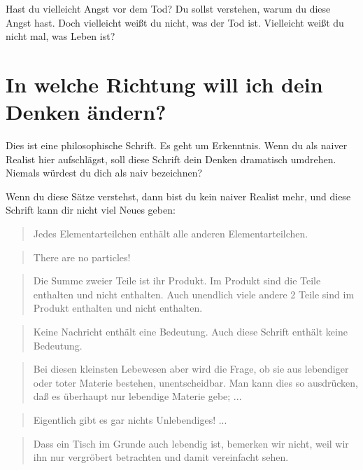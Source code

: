 \documentclass[12pt]{book}
\begin{document}
Hast du vielleicht Angst vor dem Tod? Du sollst verstehen, warum du diese Angst hast.
Doch vielleicht weißt du nicht, was der Tod ist. Vielleicht weißt du nicht mal, was Leben ist?

\section{In welche Richtung will ich dein Denken ändern?}

Dies ist eine philosophische Schrift. Es geht um Erkenntnis. Wenn du als naiver Realist hier aufschlägst, soll diese Schrift
dein Denken dramatisch umdrehen. Niemals würdest du dich als naiv bezeichnen?

Wenn du diese Sätze verstehst, dann bist du kein naiver Realist mehr, und diese Schrift kann dir nicht viel Neues geben:
\begin{quote}\begin{tcolorbox}
Jedes Elementarteilchen enthält alle anderen Elementarteilchen.
\end{tcolorbox}\end{quote}
\begin{quote}\begin{tcolorbox}
There are no particles!
\end{tcolorbox}\end{quote}
\begin{quote}\begin{tcolorbox}
Die Summe zweier Teile ist ihr Produkt. Im Produkt sind die Teile enthalten und nicht enthalten. 
Auch unendlich viele andere 2 Teile sind im Produkt enthalten und nicht enthalten.
\end{tcolorbox}\end{quote}
\begin{quote}\begin{tcolorbox}
Keine Nachricht enthält eine Bedeutung. Auch diese Schrift enthält keine Bedeutung.
\end{tcolorbox}\end{quote}
\begin{quote}\begin{tcolorbox}
Bei diesen kleinsten Lebewesen aber wird die Frage, ob sie aus lebendiger oder toter Materie bestehen, unentscheidbar. Man kann dies so ausdrücken, daß es überhaupt nur lebendige Materie gebe; ...
\end{tcolorbox}\end{quote}
\begin{quote}\begin{tcolorbox}
Eigentlich gibt es gar nichts Unlebendiges! ...
\end{tcolorbox}\end{quote}
\begin{quote}\begin{tcolorbox}
Dass ein Tisch im Grunde auch lebendig ist, bemerken wir nicht, weil wir ihn nur vergröbert betrachten und damit vereinfacht sehen.
\end{tcolorbox}\end{quote}
\end{document}
